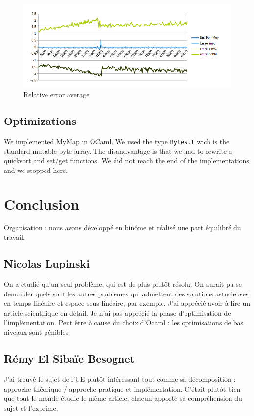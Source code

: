 \documentclass[12pt]{article}
\begin{document}
\begin{figure}[h!]
   \includegraphics[scale=0.8]{./data_corr.png}
   \caption{\label{figdataerr}Relative error average}
\end{figure}


\subsection{Optimizations}

We implemented MyMap in OCaml. We used the type \texttt{Bytes.t} wich
is the standard mutable byte array. The disandvantage is that we had
to rewrite a quicksort and set/get functions. We did not reach the end
of the implementations and we stopped here.


\section{Conclusion}

Organisation : nous avons développé en binôme et réalisé une part
équilibré du travail.

\subsection{Nicolas Lupinski} 
On a étudié qu'un seul problème, qui est de plus plutôt résolu. On
aurait pu se demander quels sont les autres problèmes qui admettent
des solutions astucieuses en temps linéaire et espace sous linéaire,
par exemple.  J'ai apprécié avoir à lire un article scientifique en
détail. Je n'ai pas apprécié la phase d'optimisation de
l'implémentation. Peut être à cause du choix d'Ocaml : les
optimisations de bas niveaux sont pénibles.
  

\subsection{Rémy El Sibaïe Besognet}
J'ai trouvé le sujet de l'UE plutôt intéressant tout comme sa
décomposition : approche théorique / approche pratique et
implémentation. C'était plutôt bien que tout le monde étudie le même
article, chacun apporte sa compréhension du sujet et l'exprime.
\end{document}
